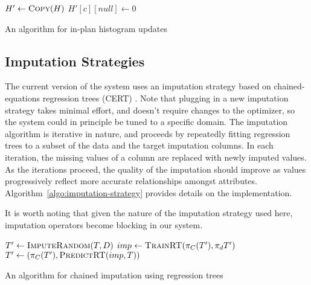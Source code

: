 \begin{algorithm}
  \begin{algorithmic}
    
	\EndIf
	\State $H' \gets \Call{Copy}{H}$
			\State $H'[c][null] \gets 0$
		\EndFor
			\State {}
		\EndFor
		\State {}
		\State {}
	\EndIf
    \EndFunction
  \end{algorithmic}
  \caption{An algorithm for in-plan histogram updates}
  \label{algo:histogram-transformation}
\end{algorithm}

\subsection{Imputation Strategies}
The current version of the system uses an imputation strategy based on chained-equations regression trees (CERT) . Note that plugging in a new
imputation strategy takes minimal effort, and doesn't require changes to the optimizer, so the system could in principle be tuned to a specific domain.
The imputation algorithm is iterative in nature, and proceeds by repeatedly fitting regression trees to a subset of the data and the target imputation columns.
In each iteration, the missing values of a column are replaced with newly imputed values. As the iterations proceed, the quality of the imputation
should improve as values progressively reflect more accurate relationships amongst attributes. Algorithm~\ref{algo:imputation-strategy}
provides details on the implementation.

It is worth noting that given the nature of the imputation strategy used here, imputation operators become blocking in our system.

\begin{algorithm}
  \begin{algorithmic}
    
    	\State $T' \gets \Call{ImputeRandom}{T, D}$
			\State $imp \gets \Call{TrainRT}{\pi_C(T'), \pi_d{T'}}$
			\State $T' \gets (\pi_C(T'), \Call{PredictRT}{imp, T})$
		\EndFor
	\EndFor
	\EndFunction
  \end{algorithmic}
  \caption{An algorithm for chained imputation using regression trees}
  \label{algo:imputation-strategy}
\end{algorithm}




